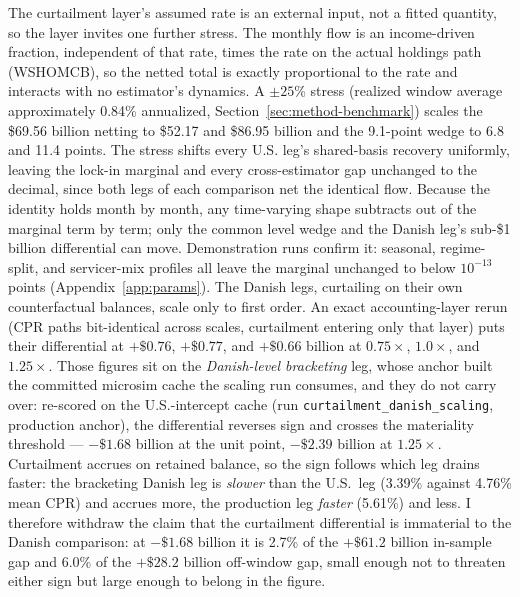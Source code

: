 \documentclass[12pt]{article}
\begin{document}
The curtailment layer's assumed rate is an external input, not a fitted quantity, so the layer invites one further stress. The monthly flow is an income-driven fraction, independent of that rate, times the rate on the actual holdings path (WSHOMCB), so the netted total is exactly proportional to the rate and interacts with no estimator's dynamics. A $\pm 25\%$ stress (realized window average approximately 0.84\% annualized, Section~\ref{sec:method-benchmark}) scales the \$69.56 billion netting to \$52.17 and \$86.95 billion and the 9.1-point wedge to 6.8 and 11.4 points. The stress shifts every U.S. leg's shared-basis recovery uniformly, leaving the lock-in marginal and every cross-estimator gap unchanged to the decimal, since both legs of each comparison net the identical flow. Because the identity holds month by month, any time-varying shape subtracts out of the marginal term by term; only the common level wedge and the Danish leg's sub-\$1 billion differential can move. Demonstration runs confirm it: seasonal, regime-split, and servicer-mix profiles all leave the marginal unchanged to below $10^{-13}$ points (Appendix~\ref{app:params}). The Danish legs, curtailing on their own counterfactual balances, scale only to first order. An exact accounting-layer rerun (CPR paths bit-identical across scales, curtailment entering only that layer) puts their differential at $+\$0.76$, $+\$0.77$, and $+\$0.66$ billion at $0.75\times$, $1.0\times$, and $1.25\times$. Those figures sit on the \emph{Danish-level bracketing} leg, whose anchor built the committed microsim cache the scaling run consumes, and they do not carry over: re-scored on the U.S.-intercept cache (run \texttt{curtailment\_danish\_scaling}, production anchor), the differential reverses sign and crosses the materiality threshold --- $-\$1.68$ billion at the unit point, $-\$2.39$ billion at $1.25\times$. Curtailment accrues on retained balance, so the sign follows which leg drains faster: the bracketing Danish leg is \emph{slower} than the U.S.\ leg (3.39\% against 4.76\% mean CPR) and accrues more, the production leg \emph{faster} (5.61\%) and less. I therefore withdraw the claim that the curtailment differential is immaterial to the Danish comparison: at $-\$1.68$ billion it is 2.7\% of the $+\$61.2$ billion in-sample gap and 6.0\% of the $+\$28.2$ billion off-window gap, small enough not to threaten either sign but large enough to belong in the figure.
\end{document}
